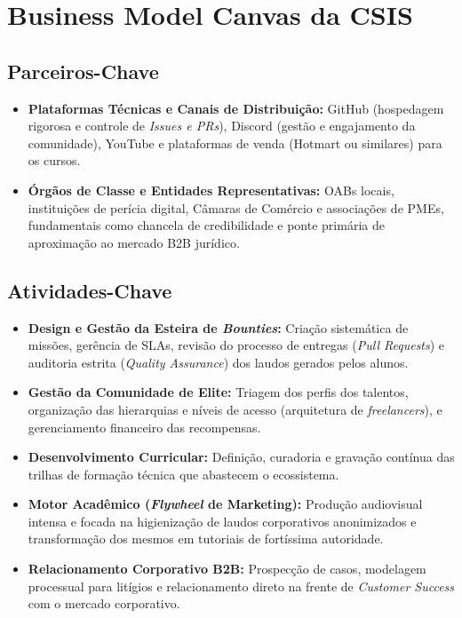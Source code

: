 \documentclass[../main.tex]{subfiles}
\begin{document}
\section{Business Model Canvas da CSIS}

\subsection*{Parceiros-Chave}
\begin{itemize}
  \item \textbf{Plataformas Técnicas e Canais de Distribuição:} GitHub (hospedagem rigorosa e controle de \textit{Issues e PRs}), Discord (gestão e engajamento da comunidade), YouTube e plataformas de venda (Hotmart ou similares) para os cursos.
  \item \textbf{Órgãos de Classe e Entidades Representativas:} OABs locais, instituições de perícia digital, Câmaras de Comércio e associações de PMEs, fundamentais como chancela de credibilidade e ponte primária de aproximação ao mercado B2B jurídico.
\end{itemize}

\subsection*{Atividades-Chave}
\begin{itemize}
  \item \textbf{Design e Gestão da Esteira de \textit{Bounties}:} Criação sistemática de missões, gerência de SLAs, revisão do processo de entregas (\textit{Pull Requests}) e auditoria estrita (\textit{Quality Assurance}) dos laudos gerados pelos alunos.
  \item \textbf{Gestão da Comunidade de Elite:} Triagem dos perfis dos talentos, organização das hierarquias e níveis de acesso (arquitetura de \textit{freelancers}), e gerenciamento financeiro das recompensas.
  \item \textbf{Desenvolvimento Curricular:} Definição, curadoria e gravação contínua das trilhas de formação técnica que abastecem o ecossistema.
  \item \textbf{Motor Acadêmico (\textit{Flywheel} de Marketing):} Produção audiovisual intensa e focada na higienização de laudos corporativos anonimizados e transformação dos mesmos em tutoriais de fortíssima autoridade.
  \item \textbf{Relacionamento Corporativo B2B:} Prospecção de casos, modelagem processual para litígios e relacionamento direto na frente de \textit{Customer Success} com o mercado corporativo.
\end{itemize}
\end{document}
